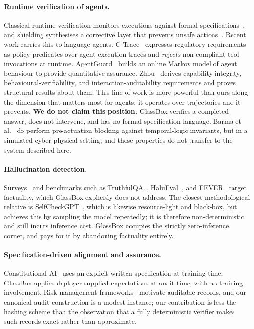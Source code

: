 \paragraph{Runtime verification of agents.}
Classical runtime verification monitors executions against formal
specifications~\cite{bartocci2018introduction}, and shielding synthesises a corrective layer
that prevents unsafe actions~\cite{alshiekh2018shielding}. Recent work carries this to
language agents. C-Trace~\cite{kahani2026ctrace} expresses regulatory requirements as policy
predicates over agent execution traces and \emph{rejects} non-compliant tool invocations at
runtime. AgentGuard~\cite{koohestani2025agentguard} builds an online Markov model of agent
behaviour to provide quantitative assurance. Zhou~\cite{zhou2026governing} derives
capability-integrity, behavioural-verifiability, and interaction-auditability requirements
and proves structural results about them. This line of work is more powerful than ours along
the dimension that matters most for agents: it operates over trajectories and it prevents.
\textbf{We do not claim this position.} GlassBox verifies a completed answer, does not
intervene, and has no formal specification language. Barma et al.~\cite{barma2026orbit}
do perform pre-actuation blocking against temporal-logic invariants, but in a simulated
cyber-physical setting, and those properties do not transfer to the system described here.

\paragraph{Hallucination detection.}
Surveys~\cite{ji2023survey,huang2023hallucination} and benchmarks such as
TruthfulQA~\cite{lin2022truthfulqa}, HaluEval~\cite{li2023halueval}, and
FEVER~\cite{thorne2018fever} target factuality, which GlassBox explicitly does not address.
The closest methodological relative is SelfCheckGPT~\cite{manakul2023selfcheckgpt}, which is
likewise resource-light and black-box, but achieves this by sampling the model repeatedly;
it is therefore non-deterministic and still incurs inference cost. GlassBox occupies the
strictly zero-inference corner, and pays for it by abandoning factuality entirely.

\paragraph{Specification-driven alignment and assurance.}
Constitutional AI~\cite{bai2022constitutional} uses an explicit written specification at
training time; GlassBox applies deployer-supplied expectations at audit time, with no
training involvement. Risk-management frameworks~\cite{nist2023airmf} motivate auditable
records, and our canonical audit construction is a modest instance; our contribution is less
the hashing scheme than the observation that a fully deterministic verifier makes such
records exact rather than approximate.

